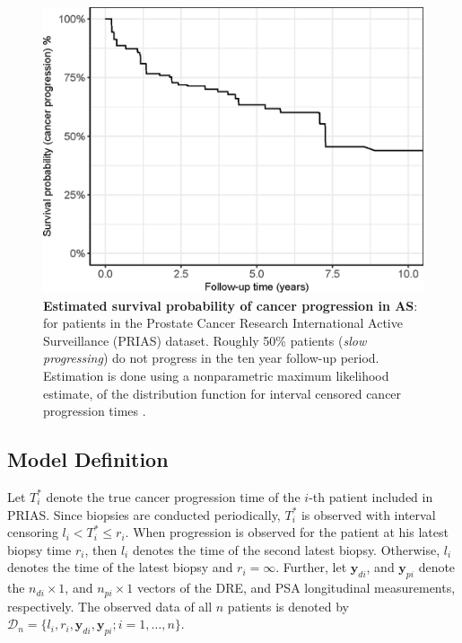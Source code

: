 \begin{figure}[!htb]
\captionsetup{justification=justified}
\centerline{\includegraphics[width=\columnwidth]{images/npmle_plot.eps}}
\caption{\textbf{Estimated survival probability of cancer progression in AS}: for patients in the Prostate Cancer Research International Active Surveillance (PRIAS) dataset. Roughly 50\% patients (\textit{slow progressing}) do not progress in the ten year follow-up period. Estimation is done using a nonparametric maximum likelihood estimate, of the distribution function for interval censored cancer progression times \citep{turnbull1976empirical}.}
\label{fig:npmle_plot}
\end{figure}

\subsection{Model Definition}
\label{subsec:model_def}
Let $T_i^*$ denote the true cancer progression time of the $i$-th patient included in PRIAS. Since biopsies are conducted periodically, $T_i^*$ is observed with interval censoring ${l_i < T_i^* \leq r_i}$. When progression is observed for the patient at his latest biopsy time $r_i$, then $l_i$ denotes the time of the second latest biopsy. Otherwise, $l_i$ denotes the time of the latest biopsy and $r_i = \infty$. Further, let $\boldsymbol{y}_{di}$, and $\boldsymbol{y}_{pi}$ denote the $n_{di} \times 1$, and $n_{pi} \times 1$ vectors of the DRE, and PSA longitudinal measurements, respectively. The observed data of all $n$ patients is denoted by ${\mathcal{D}_n = \{l_i, r_i, \boldsymbol{y}_{di}, \boldsymbol{y}_{pi}; i = 1, \ldots, n\}}$.

